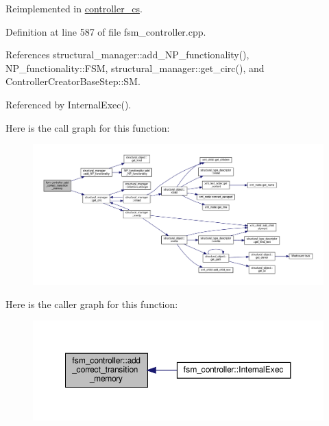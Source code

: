 Reimplemented in \hyperlink{classcontroller__cs_a4edfec7623dd2b6abd2be4a994fb19e2}{controller\+\_\+cs}.



Definition at line 587 of file fsm\+\_\+controller.\+cpp.



References structural\+\_\+manager\+::add\+\_\+\+N\+P\+\_\+functionality(), N\+P\+\_\+functionality\+::\+F\+SM, structural\+\_\+manager\+::get\+\_\+circ(), and Controller\+Creator\+Base\+Step\+::\+SM.



Referenced by Internal\+Exec().

Here is the call graph for this function\+:
\nopagebreak
\begin{figure}[H]
\begin{center}
\leavevmode
\includegraphics[width=350pt]{da/d3d/classfsm__controller_a80e22f1c0437e36734f4339828e44e68_cgraph}
\end{center}
\end{figure}
Here is the caller graph for this function\+:
\nopagebreak
\begin{figure}[H]
\begin{center}
\leavevmode
\includegraphics[width=350pt]{da/d3d/classfsm__controller_a80e22f1c0437e36734f4339828e44e68_icgraph}
\end{center}
\end{figure}
\mbox{\label{classfsm__controller_ab27526609ea8054ed2dfc08112900892}} 
